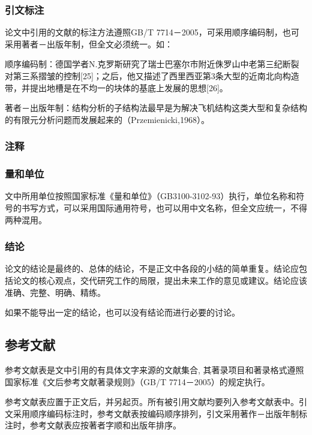 \documentclass[a4paper,12pt,oneside,openany]{book}
\begin{document}
\begin{CJK}{UTF8}{hei}
\subsubsection{引文标注}

论文中引用的文献的标注方法遵照GB/T 7714－2005，可采用顺序编码制，也可采用著者－出版年制，但全文必须统一。如：

顺序编码制：德国学者N.克罗斯研究了瑞士巴塞尔市附近侏罗山中老第三纪断裂对第三系摺皱的控制{[}25{]}；之后，他又描述了西里西亚第3条大型的近南北向构造带，并提出地槽是在不均一的块体的基底上发展的思想{[}26{]}。

著者－出版年制：结构分析的子结构法最早是为解决飞机结构这类大型和复杂结构的有限元分析问题而发展起来的（Przemienicki,1968）。 


\subsubsection{注释}




\subsubsection{量和单位}

文中所用单位按照国家标准《量和单位》（GB3100-3102-93）执行，单位名称和符号的书写方式，可以采用国际通用符号，也可以用中文名称，但全文应统一，不得两种混用。


\subsubsection{结论}

论文的结论是最终的、总体的结论，不是正文中各段的小结的简单重复。结论应包括论文的核心观点，交代研究工作的局限，提出未来工作的意见或建议。结论应该准确、完整、明确、精练。

如果不能导出一定的结论，也可以没有结论而进行必要的讨论。 


\subsection{参考文献}

参考文献表是文中引用的有具体文字来源的文献集合, 其著录项目和著录格式遵照国家标准《文后参考文献著录规则》（GB/T 7714－2005）的规定执行。

参考文献表应置于正文后，并另起页。所有被引用文献均要列入参考文献表中。引文采用顺序编码标注时，参考文献表按编码顺序排列，引文采用著作－出版年制标注时，参考文献表应按著者字顺和出版年排序。 



\end{CJK}
\end{document}
